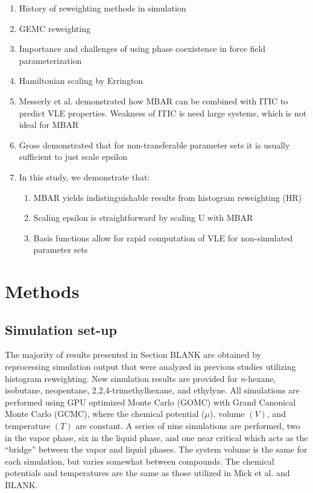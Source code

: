 \documentclass[11pt,a4paper]{article}
\begin{document}
\begin{enumerate}
	\item History of reweighting methods in simulation
	\item GEMC reweighting 
	\item Importance and challenges of using phase coexistence in force field parameterization
	\item Hamiltonian scaling by Errington
	\item Messerly et al. demonstrated how MBAR can be combined with ITIC to predict VLE properties. Weakness of ITIC is need large systems, which is not ideal for MBAR
	\item Gross demonstrated that for non-transferable parameter sets it is usually sufficient to just scale epsilon
	\item In this study, we demonstrate that:
	\begin{enumerate}
		\item MBAR yields indistinguishable results from histogram reweighting (HR)
		\item Scaling epsilon is straightforward by scaling U with MBAR
		\item Basis functions allow for rapid computation of VLE for non-simulated parameter sets
	\end{enumerate}
\end{enumerate}

\section{Methods}

\subsection{Simulation set-up}

The majority of results presented in Section BLANK are obtained by reprocessing simulation output that were analyzed in previous studies utilizing histogram reweighting. New simulation results are provided for \textit{n}-hexane, isobutane, neopentane, 2,2,4-trimethylhexane, and ethylyne. All simulations are performed using GPU optimized Monte Carlo (GOMC) with Grand Canonical Monte Carlo (GCMC), where the chemical potential ($\mu$), volume $(V)$, and temperature $(T)$ are constant. A series of nine simulations are performed, two in the vapor phase, six in the liquid phase, and one near critical which acts as the ``bridge'' between the vapor and liquid phases. The system volume is the same for each simulation, but varies somewhat between compounds. The chemical potentials and temperatures are the same as those utilized in Mick et al. and BLANK.
\end{document}
